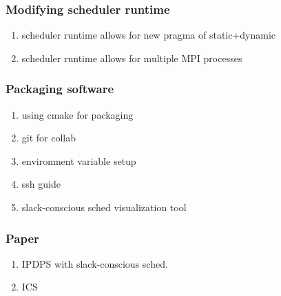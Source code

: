 \begin{frame} 
\frametitle{Modifying scheduler runtime} 
\begin{enumerate} 
\item scheduler runtime allows for new pragma of static+dynamic
\item scheduler runtime allows for multiple MPI processes 
\end{enumerate} 
\end{frame} 

\begin{frame} 
\frametitle{Packaging software} 
\begin{enumerate} 
\item using cmake for packaging
\item git for collab 
\item environment variable setup
\item ssh guide
\item slack-conscious sched visualization tool 
\end{enumerate} 
\end{frame} 

\begin{frame} 
\frametitle{Paper} 
\begin{enumerate}
\item IPDPS with slack-conscious sched. 
\item ICS 
\end{enumerate} 
\end{frame} 
